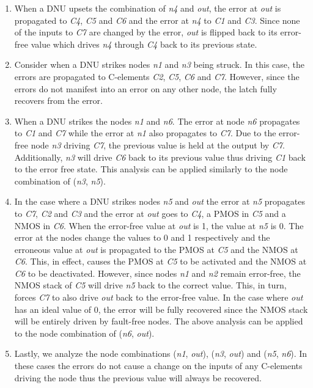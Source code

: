 \begin{enumerate}
	\item When a DNU upsets the combination of \textit{n4} and \textit{out}, the error at \textit{out} is propagated to \textit{C4}, \textit{C5} and \textit{C6} and the error at \textit{n4} to \textit{C1} and \textit{C3}. Since none of the inputs to \textit{C7} are changed by the error, \textit{out} is flipped back to its error-free value which drives \textit{n4} through \textit{C4} back to its previous state.
	
	\item Consider when a DNU strikes nodes \textit{n1} and \textit{n3} being struck. In this case, the errors are propagated to C-elements \textit{C2}, \textit{C5}, \textit{C6} and \textit{C7}. However, since the errors do not manifest into an error on any other node, the latch fully recovers from the error. 
	
	\item When a DNU strikes the nodes \textit{n1} and \textit{n6}. The error at node \textit{n6} propagates to  \textit{C1} and \textit{C7} while the error at \textit{n1} also propagates to \textit{C7}. Due to the error-free node \textit{n3} driving \textit{C7}, the previous value is held at the output by \textit{C7}. Additionally, \textit{n3} will drive \textit{C6} back to its previous value thus driving \textit{C1} back to the error free state. This analysis can be applied similarly to the node combination of (\textit{n3}, \textit{n5}). 
	
	\item In the case where a DNU strikes nodes \textit{n5} and \textit{out} the error at \textit{n5} propagates to \textit{C7}, \textit{C2} and \textit{C3} and the error at \textit{out} goes to \textit{C4}, a PMOS in \textit{C5} and a NMOS in \textit{C6}. When the error-free value at \textit{out} is 1, the value at \textit{n5} is 0. The error at the nodes change the values to 0 and 1 respectively and the erroneous value at \textit{out} is propagated to the PMOS at \textit{C5} and the NMOS at \textit{C6}. This, in effect, causes the PMOS at \textit{C5} to be activated and the NMOS at \textit{C6} to be deactivated. However, since nodes \textit{n1} and \textit{n2} remain error-free, the NMOS stack of \textit{C5} will drive \textit{n5} back to the correct value. This, in turn, forces \textit{C7} to also drive \textit{out} back to the error-free value. In the case where \textit{out} has an ideal value of 0, the error will be fully recovered since the NMOS stack will be entirely driven by fault-free nodes. The above analysis can be applied to the node combination of (\textit{n6}, \textit{out}). 
	
	\item Lastly, we analyze the node combinations (\textit{n1}, \textit{out}), (\textit{n3}, \textit{out}) and (\textit{n5}, \textit{n6}). In these cases the errors do not cause a change on the inputs of any C-elements driving the node thus the previous value will always be recovered. 
\end{enumerate}

